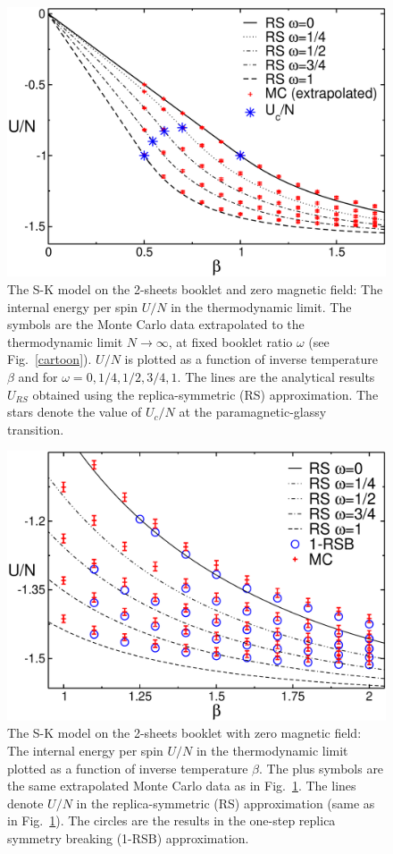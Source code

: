 \documentclass[twocolumn,superscriptaddress,prb,10pt]{revtex4-1}
\begin{document}
\begin{figure}[t]
\includegraphics*[width=0.93\linewidth]{./draft_figs/U_extrapolated}
\caption{
 The S-K model on the 2-sheets booklet and zero magnetic field: 
 The internal energy per spin $U/N$ in the thermodynamic limit. 
 The symbols are the Monte Carlo data extrapolated to the thermodynamic 
 limit $N\to\infty$, at fixed booklet ratio $\omega$ (see Fig.~\ref{cartoon}).  
 $U/N$ is plotted as a function of inverse temperature $\beta$ and for 
 $\omega=0,1/4,1/2,3/4,1$. The lines are the analytical results $U_{RS}$ 
 obtained using the replica-symmetric (RS) approximation. The stars denote 
 the value of $U_c/N$ at the paramagnetic-glassy transition. 
}
\label{U-RS}
\end{figure}

\begin{figure}[t]
\includegraphics*[width=0.93\linewidth]{./draft_figs/U_extrapolated_v1}
\caption{
 The S-K model on the 2-sheets booklet with zero magnetic field: 
 The internal energy per spin $U/N$ in the thermodynamic limit plotted 
 as a function of inverse temperature $\beta$. The plus symbols are the same 
 extrapolated Monte Carlo data as in Fig.~\ref{U-RS}. The lines denote $U/N$ 
 in the replica-symmetric (RS) approximation (same as in Fig.~\ref{U-RS}). 
 The circles are the results  in the one-step replica symmetry breaking 
 (1-RSB) approximation.
}
\label{U-RSB-1}
\end{figure}
\end{document}
